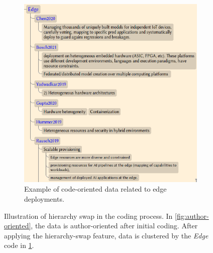 \begin{figure}
\begin{subfigure}[b]{0.45\textwidth}
    \includegraphics[width=\textwidth]{figures/code-oriented.png}
    \caption{Example of code-oriented data related to edge deployments.}
    \label{fig:code-oriented}
\end{subfigure}
\hfill
\caption{Illustration of hierarchy swap in the coding process. In \cref{fig:author-oriented}, the data is author-oriented after initial coding. After applying the hierarchy-swap feature, data is clustered by the \emph{Edge} code in \cref{fig:code-oriented}.}
\label{fig:hierarchy_swap}
\end{figure}
    